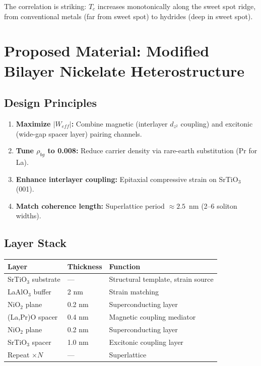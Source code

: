 \documentclass[11pt, a4paper]{article}
\begin{document}
The correlation is striking: $T_c$ increases monotonically along
the sweet spot ridge, from conventional metals (far from sweet spot)
to hydrides (deep in sweet spot).

\section{Proposed Material: Modified Bilayer Nickelate Heterostructure}

\subsection{Design Principles}

\begin{enumerate}[nosep]
  \item \textbf{Maximize $|W_{eff}|$:} Combine magnetic (interlayer
        $d_{z^2}$ coupling) and excitonic (wide-gap spacer layer)
        pairing channels.
  \item \textbf{Tune $\rho_{bg}$ to 0.008:} Reduce carrier density
        via rare-earth substitution (Pr for La).
  \item \textbf{Enhance interlayer coupling:} Epitaxial compressive
        strain on SrTiO$_3$(001).
  \item \textbf{Match coherence length:} Superlattice period
        $\approx 2.5$~nm (2--6 soliton widths).
\end{enumerate}

\subsection{Layer Stack}

\begin{center}
\begin{tabular}{@{}lll@{}}
\toprule
\textbf{Layer} & \textbf{Thickness} & \textbf{Function} \\
\midrule
SrTiO$_3$ substrate & --- & Structural template, strain source \\
LaAlO$_3$ buffer & 2 nm & Strain matching \\
NiO$_2$ plane & 0.2 nm & Superconducting layer \\
(La,Pr)O spacer & 0.4 nm & Magnetic coupling mediator \\
NiO$_2$ plane & 0.2 nm & Superconducting layer \\
SrTiO$_3$ spacer & 1.0 nm & Excitonic coupling layer \\
Repeat $\times N$ & --- & Superlattice \\
\bottomrule
\end{tabular}
\end{center}
\end{document}
